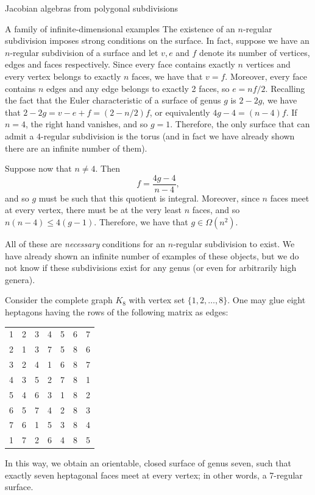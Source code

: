 \begin{chapter}{Jacobian algebras from polygonal subdivisions}
\begin{section}{A family of infinite-dimensional examples}
The existence of an $n$-regular subdivision imposes strong conditions on the surface. In fact, suppose we have an $n$-regular subdivision of a surface and let $v, e$ and $f$ denote its number of vertices, edges and faces respectively. Since every face contains exactly $n$ vertices and every vertex belongs to exactly $n$ faces, we have that $v=f$. Moreover, every face contains $n$ edges and any edge belongs to exactly 2 faces, so $e=nf/2$.
Recalling the fact that the Euler characteristic of a surface of genus $g$ is $2-2g$, we have that $2-2g=v-e+f=(2-n/2)f$, or equivalently $4g-4 = (n-4)f$. If $n=4$, the right hand vanishes, and so $g=1$. Therefore, the only surface that can admit a $4$-regular subdivision is the torus (and in fact we have already shown there are an infinite number of them).

Suppose now that $n\neq 4$. Then
\begin{equation}
\label{euler-regular}f=\frac{4g-4}{n-4},
\end{equation}and so $g$ must be such that this quotient is integral. Moreover, since $n$ faces meet at every vertex, there must be at the very least $n$ faces, and so $n(n-4)\leq 4(g-1)$. Therefore, we have that $g\in \Omega(n^2)$.

All of these are \emph{necessary} conditions for an $n$-regular subdivision to exist. We have already shown an infinite number of examples of these objects, but we do not know if these subdivisions exist for any genus (or even for arbitrarily high genera).

\begin{exmp} Consider the complete graph $K_8$ with vertex set $\{1,2,\dots,8\}$. One may glue eight heptagons having the rows of the following matrix as edges:
\begin{center}
\begin{tabular}{ c  c  c  c  c  c  c }
1 &  2 &  3 &  4 &  5 &  6 &  7\\
2 &  1 &  3 &  7 &  5 &  8 &  6\\
3 &  2 &  4 &  1 &  6 &  8 &  7\\
4 &  3 &  5 &  2 &  7 &  8 &  1\\
5 &  4 &  6 &  3 &  1 &  8 &  2\\
6 &  5 &  7 &  4 &  2 &  8 &  3\\
7 &  6 &  1 &  5 &  3 &  8 &  4\\
1 &  7 &  2 &  6 &  4 &  8 &  5
\end{tabular}
\end{center}
In this way, we obtain an orientable, closed surface of genus seven, such that exactly seven heptagonal faces meet at every vertex; in other words, a 7-regular surface.
\end{exmp}


\end{section}
\end{chapter}
